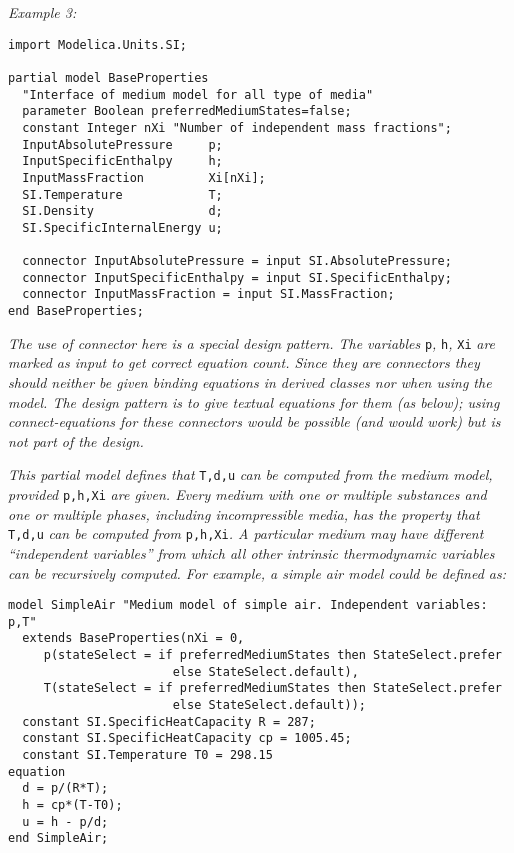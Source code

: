 \emph{Example 3:}
\begin{lstlisting}[language=modelica]
import Modelica.Units.SI;

partial model BaseProperties
  "Interface of medium model for all type of media"
  parameter Boolean preferredMediumStates=false;
  constant Integer nXi "Number of independent mass fractions";
  InputAbsolutePressure     p;
  InputSpecificEnthalpy     h;
  InputMassFraction         Xi[nXi];
  SI.Temperature            T;
  SI.Density                d;
  SI.SpecificInternalEnergy u;

  connector InputAbsolutePressure = input SI.AbsolutePressure;
  connector InputSpecificEnthalpy = input SI.SpecificEnthalpy;
  connector InputMassFraction = input SI.MassFraction;
end BaseProperties;
\end{lstlisting}

\emph{The use of connector here is a special design pattern. The
variables} \lstinline!p!\emph{,} \lstinline!h!\emph{,} \lstinline!Xi! \emph{are marked as input to get
correct equation count. Since they are connectors they should neither be
given binding equations in derived classes nor when using the model. The
design pattern is to give textual equations for them (as below); using
connect-equations for these connectors would be possible (and would
work) but is not part of the design.}

\emph{This partial model defines that} \lstinline!T,d,u! \emph{can be computed from
the medium model, provided} \lstinline!p,h,Xi! \emph{are given. Every medium with
one or multiple substances and one or multiple phases, including
incompressible media, has the property that} \lstinline!T,d,u! \emph{can be computed
from} \lstinline!p,h,Xi!\emph{. A particular medium may have different ``independent
variables'' from which all other intrinsic thermodynamic variables can
be recursively computed. For example, a simple air model could be
defined as:}

\begin{lstlisting}[language=modelica]
model SimpleAir "Medium model of simple air. Independent variables: p,T"
  extends BaseProperties(nXi = 0,
     p(stateSelect = if preferredMediumStates then StateSelect.prefer
                       else StateSelect.default),
     T(stateSelect = if preferredMediumStates then StateSelect.prefer
                       else StateSelect.default));
  constant SI.SpecificHeatCapacity R = 287;
  constant SI.SpecificHeatCapacity cp = 1005.45;
  constant SI.Temperature T0 = 298.15
equation
  d = p/(R*T);
  h = cp*(T-T0);
  u = h - p/d;
end SimpleAir;
\end{lstlisting}

